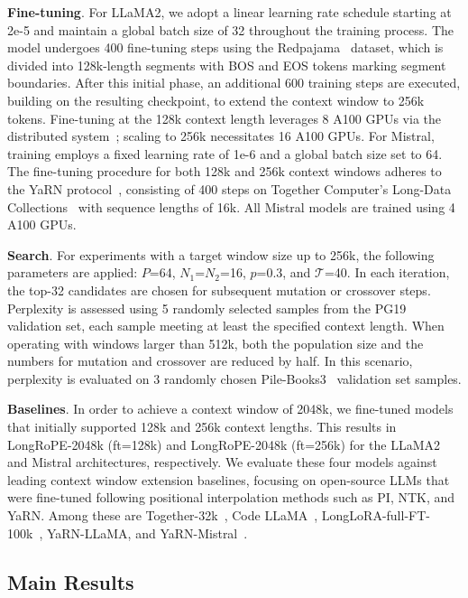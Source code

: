 \textbf{Fine-tuning}. For LLaMA2, we adopt a linear learning rate schedule starting at 2e-5 and maintain a global batch size of 32 throughout the training process. The model undergoes 400 fine-tuning steps using the Redpajama~\cite{redpajama} dataset, which is divided into 128k-length segments with BOS and EOS tokens marking segment boundaries. After this initial phase, an additional 600 training steps are executed, building on the resulting checkpoint, to extend the context window to 256k tokens. Fine-tuning at the 128k context length leverages 8 A100 GPUs via the distributed system~\cite{cube}; scaling to 256k necessitates 16 A100 GPUs. For Mistral, training employs a fixed learning rate of 1e-6 and a global batch size set to 64. The fine-tuning procedure for both 128k and 256k context windows adheres to the YaRN protocol~\cite{yarn}, consisting of 400 steps on Together Computer's Long-Data Collections~\cite{mistraldata} with sequence lengths of 16k. All Mistral models are trained using 4 A100 GPUs.

\textbf{Search}. For experiments with a target window size up to 256k, the following parameters are applied: $P$=64, $N_1$=$N_2$=16, $p$=0.3, and $\mathcal{T}$=40. In each iteration, the top-32 candidates are chosen for subsequent mutation or crossover steps. Perplexity is assessed using 5 randomly selected samples from the PG19 validation set, each sample meeting at least the specified context length. When operating with windows larger than 512k, both the population size and the numbers for mutation and crossover are reduced by half. In this scenario, perplexity is evaluated on 3 randomly chosen Pile-Books3~\cite{pile} validation set samples.

\textbf{Baselines}. In order to achieve a context window of 2048k, we fine-tuned models that initially supported 128k and 256k context lengths. This results in LongRoPE-2048k (ft=128k) and LongRoPE-2048k (ft=256k) for the LLaMA2 and Mistral architectures, respectively. We evaluate these four models against leading context window extension baselines, focusing on open-source LLMs that were fine-tuned following positional interpolation methods such as PI, NTK, and YaRN. Among these are Together-32k~\cite{together}, Code LLaMA~\cite{codellama}, LongLoRA-full-FT-100k~\cite{longlora}, YaRN-LLaMA, and YaRN-Mistral~\cite{yarn}.

\subsection{Main Results}

